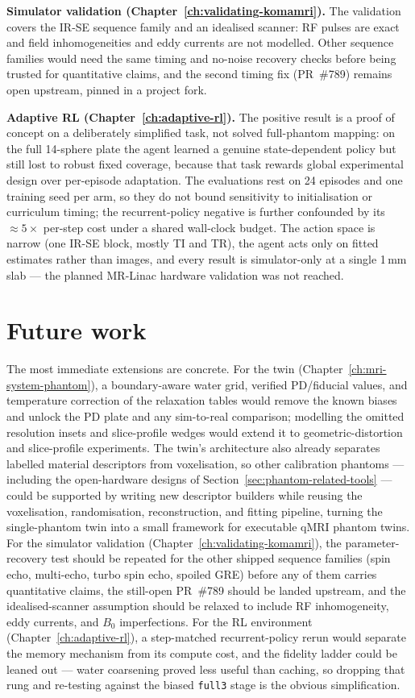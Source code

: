 \textbf{Simulator validation (Chapter~\ref{ch:validating-komamri}).} The
validation covers the IR-SE sequence family and an idealised scanner: RF
pulses are exact and field inhomogeneities and eddy currents are not modelled.
Other sequence families would need the same timing and no-noise recovery
checks before being trusted for quantitative claims, and the second timing
fix (PR~\#789) remains open upstream, pinned in a project fork.

\textbf{Adaptive RL (Chapter~\ref{ch:adaptive-rl}).} The positive result is a
proof of concept on a deliberately simplified task, not solved full-phantom
mapping: on the full 14-sphere plate the agent learned a genuine
state-dependent policy but still lost to robust fixed coverage, because that
task rewards global experimental design over per-episode adaptation. The
evaluations rest on 24 episodes and one training seed per arm, so they do not
bound sensitivity to initialisation or curriculum timing; the recurrent-policy
negative is further confounded by its ${\approx}5\times$ per-step cost under a
shared wall-clock budget. The action space is narrow (one IR-SE block, mostly
TI and TR), the agent acts only on fitted estimates rather than images, and
every result is simulator-only at a single 1\,mm slab --- the planned MR-Linac
hardware validation was not reached.

\section{Future work}
\label{sec:concl-future}

The most immediate extensions are concrete. For the twin
(Chapter~\ref{ch:mri-system-phantom}), a boundary-aware water grid, verified
PD/fiducial values, and temperature correction of the relaxation tables would
remove the known biases and unlock the PD plate and any sim-to-real
comparison; modelling the omitted resolution insets and slice-profile wedges
would extend it to geometric-distortion and slice-profile experiments. The
twin's architecture also already separates labelled material descriptors from
voxelisation, so other calibration phantoms --- including the open-hardware
designs of Section~\ref{sec:phantom-related-tools} --- could be supported by
writing new descriptor builders while reusing the voxelisation, randomisation,
reconstruction, and fitting pipeline, turning the single-phantom twin into a
small framework for executable qMRI phantom twins. For the simulator
validation (Chapter~\ref{ch:validating-komamri}), the parameter-recovery test
should be repeated for the other shipped sequence families (spin echo,
multi-echo, turbo spin echo, spoiled GRE) before any of them carries
quantitative claims, the still-open PR~\#789 should be landed upstream, and
the idealised-scanner assumption should be relaxed to include RF
inhomogeneity, eddy currents, and $B_0$ imperfections. For the RL environment
(Chapter~\ref{ch:adaptive-rl}), a step-matched recurrent-policy rerun would
separate the memory mechanism from its compute cost, and the fidelity ladder
could be leaned out --- water coarsening proved less useful than caching, so
dropping that rung and re-testing against the biased \texttt{full3} stage is
the obvious simplification.


